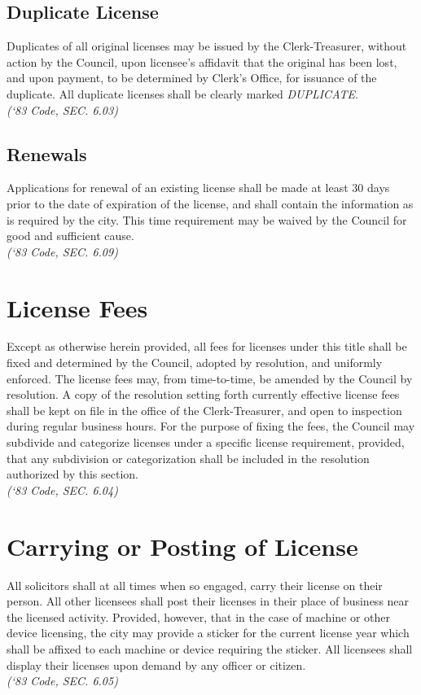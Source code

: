 \subsection{Duplicate License}
Duplicates of all original licenses may be issued by the Clerk-Treasurer, without action by the Council, upon licensee’s affidavit that the original has been lost, and upon payment, to be determined by Clerk’s Office, for issuance of the duplicate.  All duplicate licenses shall be clearly marked \emph{DUPLICATE}.\\
\emph{(‘83 Code, SEC. 6.03)}
\subsection{Renewals}
Applications for renewal of an existing license shall be made at least 30 days prior to the date of expiration of the license, and shall contain the information as is required by the city.  This time requirement may be waived by the Council for good and sufficient cause.\\
\emph{(‘83 Code, SEC. 6.09)}

\section{License Fees}
Except as otherwise herein provided, all fees for licenses under this title shall be fixed and determined by the Council, adopted by resolution, and uniformly enforced.  The license fees may, from time-to-time, be amended by the Council by resolution.  A copy of the resolution setting forth currently effective license fees shall be kept on file in the office of the Clerk-Treasurer, and open to inspection during regular business hours.  For the purpose of fixing the fees, the Council may subdivide and categorize licenses under a specific license requirement, provided, that any subdivision or categorization shall be included in the resolution authorized by this section.\\
\emph{(‘83 Code, SEC. 6.04)}

\section{Carrying or Posting of License}
All solicitors shall at all times when so engaged, carry their license on their person.  All other licensees shall post their licenses in their place of business near the licensed activity.  Provided, however, that in the case of machine or other device licensing, the city may provide a sticker for the current license year which shall be affixed to each machine or device requiring the sticker.  All licensees shall display their licenses upon demand by any officer or citizen.\\
\emph{(‘83 Code, SEC. 6.05)}

